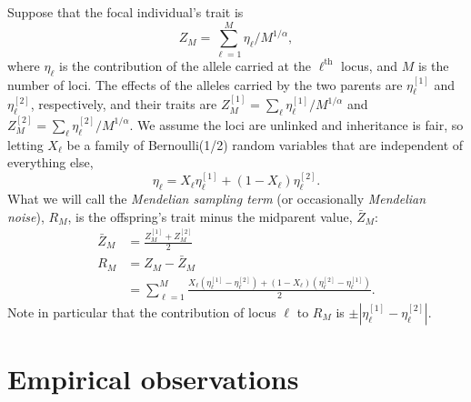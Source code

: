 \documentclass{article}
\newcommand{\1}{\mathbbm{1}}
\theoremstyle{remark}
\theoremstyle{definition}
\begin{document}
Suppose that the focal individual's trait is
$$
    Z_M = \sum_{\ell=1}^M \eta_\ell / M^{1/\alpha},
$$
where $\eta_\ell$ is the contribution of the allele carried at the $\ell^\text{th}$ locus,
and $M$ is the number of loci. 
The effects of the alleles carried by the two parents
are $\eta_\ell^{[1]}$ and $\eta_\ell^{[2]}$, respectively,
and their traits are
$Z_M^{[1]} = \sum_\ell \eta_\ell^{[1]} / M^{1/\alpha}$ and
$Z_M^{[2]} = \sum_\ell \eta_\ell^{[2]} / M^{1/\alpha}$.
We assume the loci are unlinked and inheritance is fair, so
letting $X_\ell$ be a family of Bernoulli(1/2) random variables that are independent of everything else,
$$
    \eta_\ell = X_\ell \eta_\ell^{[1]} + (1 - X_\ell) \eta_\ell^{[2]} .
$$
What we will call the \emph{Mendelian sampling term}
(or occasionally \emph{Mendelian noise}), $R_M$,
is the offspring's trait minus the midparent value, $\bar Z_M$:
\begin{align*}
    \bar Z_M &= \frac{Z_M^{[1]} + Z_M^{[2]}}{2} \\
    R_M &= Z_M - \bar Z_M \\
        &= \sum_{\ell=1}^M
            \frac{
                X_\ell (\eta_\ell^{[1]} - \eta_\ell^{[2]})
                + (1 - X_\ell) (\eta_\ell^{[2]} - \eta_\ell^{[1]})
            }{ 2 } .
\end{align*}
Note in particular that
the contribution of locus $\ell$ to $R_M$ is $\pm |\eta_\ell^{[1]} - \eta_\ell^{[2]}|$.


\section{Empirical observations}
    \label{sec:empirical}
\end{document}
